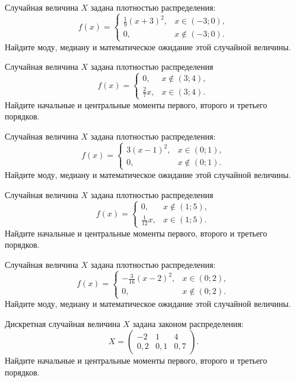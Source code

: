 \vfill

\newpage\setcounter{zad}{0}

\z Случайная величина $X$ задана плотностью распределения: $$f(x) = \begin{cases} \frac{1}{9}(x+3)^2, & x \in (-3; 0), \\ 0, & x \not\in (-3; 0). \end{cases}$$ Найдите моду, медиану и математическое ожидание этой случайной величины.


\vfill

\z Случайная величина $X$ задана плотностью распределения $$f(x) = \begin{cases}0, & x\not\in(3; 4), \\ \frac{2}{7}x, & x\in(3; 4).\end{cases}$$ Найдите начальные и центральные моменты первого, второго и третьего порядков.
 

\vfill

\newpage\setcounter{zad}{0}

\z Случайная величина $X$ задана плотностью распределения: $$f(x) = \begin{cases} 3(x-1)^2, & x \in (0; 1), \\ 0, & x \not\in (0; 1). \end{cases}$$ Найдите моду, медиану и математическое ожидание этой случайной величины.


\vfill

\z Случайная величина $X$ задана плотностью распределения $$f(x) = \begin{cases}0, & x\not\in(1; 5), \\ \frac{1}{12}x, & x\in(1; 5).\end{cases}$$ Найдите начальные и центральные моменты первого, второго и третьего порядков.
 

\vfill

\newpage\setcounter{zad}{0}

\z Случайная величина $X$ задана плотностью распределения: $$f(x) = \begin{cases} -\frac{3}{16}(x-2)^2, & x \in (0; 2), \\ 0, & x \not\in (0; 2). \end{cases}$$ Найдите моду, медиану и математическое ожидание этой случайной величины.


\vfill

\z Дискретная случайная величина $X$ задана законом распределения: $$ X = \left(\begin{array}{rrr}-2 & 1 & 4\\0{,}2 & 0{,}1 & 0{,}7\end{array}\right).$$ Найдите начальные и центральные моменты первого, второго и третьего порядков.
 

